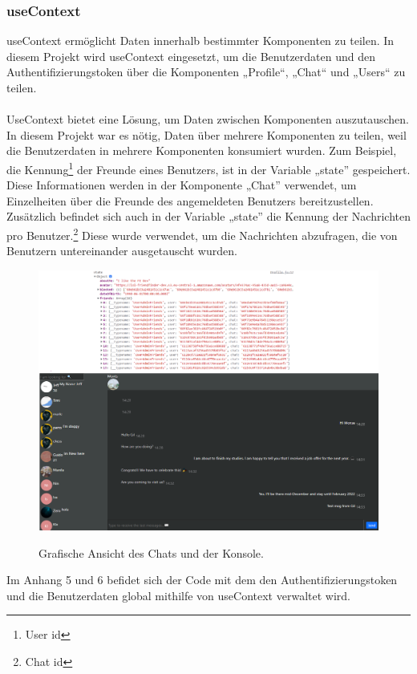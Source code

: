 \subsubsection*{useContext}
useContext ermöglicht Daten innerhalb bestimmter Komponenten zu teilen.
In diesem Projekt wird useContext eingesetzt, um die Benutzerdaten und den Authentifizierungstoken über die Komponenten  „Profile“, „Chat“ und „Users“ zu teilen.
\\\\
UseContext bietet eine Lösung, um Daten zwischen Komponenten auszutauschen.{\cite{R04}}
\\
In diesem Projekt war es nötig, Daten über mehrere Komponenten zu teilen, weil die Benutzerdaten in mehrere Komponenten konsumiert wurden.
Zum Beispiel, die Kennung\footnote{User id} der Freunde eines Benutzers, ist in der Variable „state” gespeichert. Diese Informationen werden in der Komponente „Chat” verwendet, um Einzelheiten über die Freunde des angemeldeten Benutzers bereitzustellen. Zusätzlich befindet sich auch in der Variable „state” die Kennung der Nachrichten pro Benutzer.\footnote{Chat id} Diese wurde verwendet, um die Nachrichten abzufragen, die von Benutzern untereinander ausgetauscht wurden.
\begin{figure}[h!]
  \centering
  \includegraphics[scale=0.45]{sources/Friends_in_Chat}
  \caption[Einzelheiten der Freunden]{}
  \label{fig:Friends_in_Chat} 
  Grafische Ansicht des Chats und der Konsole. 
\end{figure} 
Im Anhang 5 und 6 befidet sich der Code mit dem den Authentifizierungstoken und die Benutzerdaten global  mithilfe von useContext verwaltet wird.
